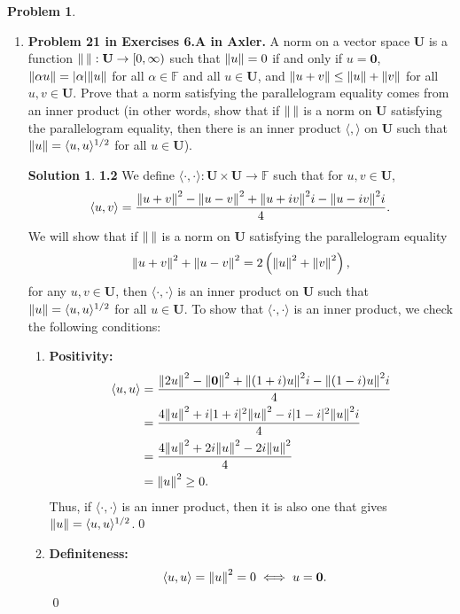 \documentclass{article}
\theoremstyle{definition}
\newtheorem*{prob*}{Problem}
\newtheorem*{sln*}{Solution}
\newcommand{\U}{\mathbf{U}}
\newcommand{\la}{\langle}
\newcommand{\ra}{\rangle}
\begin{document}
\begin{prob*}
\begin{enumerate}
		
		\newpage
		
		
		
		\item \textbf{Problem 21 in Exercises 6.A in Axler.} A norm on a vector space $\U$ is a function $\norm{\,}: \U \to [0,\infty) $ such that $\norm{u} = 0$ if and only if $u = \mathbf{0}$, $\norm{\alpha u} = \vert \alpha \vert \norm{u}$ for all $\alpha \in \mathbb{F}$ and all $u \in \U$, and $\norm{u + v} \leq \norm{u} + \norm{v}$ for all $u,v \in \U$. Prove that a norm satisfying the parallelogram equality comes from an inner product (in other words, show that if $\norm{\,}$ is a norm on $\U$ satisfying the parallelogram equality, then there is an inner product $\la ,\ra$ on $\U$ such that $\norm{u} = \la u,u\ra^{1/2}$ for all $u\in \U$). 
		
		
		\begin{sln*}\textbf{1.2}
			We define $\la \cdot,\cdot \ra : \U \times \U \to \mathbb{F}$ such that for $u,v \in \U$,
			\begin{align*}
			\la u ,v \ra = \frac{\norm{u+ v}^2  - \norm{u-v}^2 + \norm{u + iv}^2i - \norm{u - iv}^2i   }{4}.
			\end{align*} 
			We will show that if $\norm{\,}$ is a norm on $\U$ satisfying the parallelogram equality 
			\begin{align*}
			\norm{u+v}^2 + \norm{u-v}^2 = 2   \left( \norm{u}^2 + \norm{v}^2 \right),
			\end{align*}
			for any $u,v \in \U$, then $\la \cdot,\cdot\ra$ is an inner product on $\U$ such that $\norm{u} = \la u,u\ra^{1/2}$ for all $u\in \U$.  To show that $\la \cdot , \cdot \ra$ is an inner product, we check the following conditions:
			\begin{enumerate}
				\item \textbf{Positivity:}
				\begin{align*}
				\la u ,u \ra &= \frac{\norm{2u}^2  - \norm{\mathbf{0}}^2 + \norm{(1+i)u}^2i - \norm{(1-i)u}^2i   }{4}\\
				&= \frac{4\norm{u}^2 + i\vert 1+i\vert^2 \norm{u}^2 - i\vert 1 - i \vert^2 \norm{u}^2i   }{4}\\
				&= \frac{4\norm{u}^2 + 2i \norm{u}^2 - 2i \norm{u}^2  }{4}\\
				&= \norm{u}^2 \geq 0.
				\end{align*}
				Thus, if $\la \cdot, \cdot \ra$ is an inner product, then it is also one that gives $\norm{u} = \la u,u\ra^{1/2}$.\qed
				
				\item \textbf{Definiteness:}
				\begin{align*}
				\la u ,u \ra &= \norm{u}^2 = 0 \iff u = \mathbf{0}. 
				\end{align*}\qed
				

\end{enumerate}
\end{sln*}
\end{enumerate}
\end{prob*}
\end{document}
